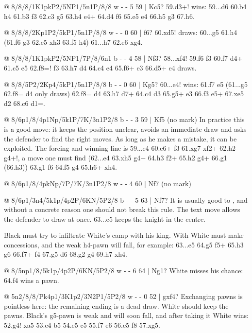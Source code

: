 @ 8/8/8/1K1pkP2/5NP1/5n1P/8/8 w - - 5 59 | Kc5?
59.\N d3+! wins: 59...\K d6 60.\K b4 \N h4 61.\K b3 \N f3 62.\K c3 \N g5 63.h4 \N e4+ 64.\K d4 \N f6
65.\N e5 \N e4 66.h5 \N g3 67.h6.

@ 8/8/8/2Kp1P2/5kP1/5n1P/8/8 w - - 0 60 | f6?
60.\K xd5! draws: 60...\N g5 61.h4 (61.f6 \K g3 62.\K e5 \K xh3 63.\K f5 \K h4) 61...\N h7 62.\K e6
\K xg4.

@ 8/8/8/1K1pkP2/5NP1/7P/8/6n1 b - - 4 58 | Nf3?
58...\K xf4! 59.f6 \N f3 60.f7 \N d4+ 61.\K c5 \K e5 62.f8=\N! \N f3 63.\N h7
d4 64.\K c4 \K e4 65.\N f6+ \K e3 66.\N d5+ \K e4 draws.

@ 8/8/5P2/2Kp4/5kP1/5n1P/8/8 b - - 0 60 | Kg5?
60...\K e4! wins: 61.f7 \N e5 (61...\N g5 62.f8=\N{} d4 only draws) 62.f8=\N{} d4 63.\N h7 \N d7+
64.\K c4 d3 65.\N g5+ \K e3 66.\N f3 \N e5+ 67.\N xe5 d2 68.\N c6 d1=\Q{}.

@ 8/6p1/8/4p1Np/5k1P/7K/3n1P2/8 b - - 3 59 | Kf5 (no mark)
In practice this is a good move: it keeps the position unclear, avoids an immediate draw and asks
the defender to find the right moves. As long as he makes a mistake, it can be exploited. The
forcing and winning line is 59...\N e4 60.\N e6+ \K f3 61.\N xg7 \N xf2+ 62.\K h2 \N g4+!, a move one
must find (62...e4 63.\N xh5 \N g4+ 64.\K h3 \N f2+ 65.\K h2 \N g4+ 66.\K g1 (66.\K h3)) 63.\K g1
\N f6 64.\N f5 \K g4 65.\N h6+ \K xh4.

@ 8/6p1/8/4pkNp/7P/7K/3n1P2/8 w - - 4 60 | Nf7 (no mark)

@ 8/6p1/3n4/5k1p/4p2P/6KN/5P2/8 b - - 5 63 | Nf7?
It is usually good to , and without a concrete reason one should not break
this rule. The text move allows the defender to draw at once.
63...\K e5 keeps the knight in the centre.

Black must try to infiltrate White's camp with his king. With  White
must make concessions, and the weak h4-pawn will fall, for example: 63...\K e5 64.\N g5 \N f5+
65.\K h3 g6 66.\N f7+ \K f4 67.\N g5 \N d6 68.\K g2 \K g4 69.\N h7 \K xh4.

@ 8/5np1/8/5k1p/4p2P/6KN/5P2/8 w - - 6 64 | Ng1?
White misses his chance: 64.\N f4 wins a pawn.

@ 5n2/8/8/Pk4p1/3K1p2/3N2P1/5P2/8 w - - 0 52 | gxf4?
Exchanging pawns is pointless here: the remaining ending is a dead draw. White should keep the
pawns. Black's g5-pawn is weak and will soon fall, and after taking it White wins: 52.g4! \K xa5
53.\K e4 \K b5 54.\N e5 \K c5 55.\N f7 \N e6 56.\K e5 \N f8 57.\N xg5.

